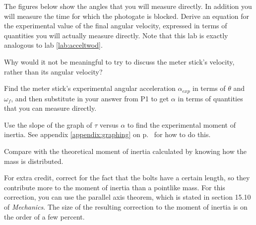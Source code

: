 \prelab

\prelabquestion  The figures below show the angles that you will measure
directly. In addition you will measure the time for which the photogate
is blocked. Derive an equation for the experimental value of the
final angular velocity, expressed in terms of quantities you
will actually measure directly. Note that this
lab is exactly analogous to lab \ref{lab:acceltwod}.


\prelabquestion  Why would it not be meaningful to try to discuss the
meter stick's velocity, rather than its angular velocity?

\prelabquestion Find the meter stick's experimental angular acceleration
$\alpha_{exp}$ in terms of $\theta$ and $\omega_f$, and then substitute
in your answer from P1 to get $\alpha$ in terms of quantities that
you can measure directly.

\analysis

Use the slope of the graph of $\tau$ versus $\alpha$ to find the
experimental moment of inertia. See appendix \ref{appendix:graphing}
on p.~\pageref{appendix:graphing} for how to do this.

Compare with the theoretical
moment of inertia calculated by knowing how the mass is distributed.

For extra credit,
correct for the fact that the bolts have a certain length,
so they contribute more to the moment of inertia than a pointlike mass.
For this correction, you can use the parallel axis theorem, which is
stated in section 15.10 of \emph{Mechanics}. The size of
the resulting correction to the moment of inertia is on the order of a few
percent.
